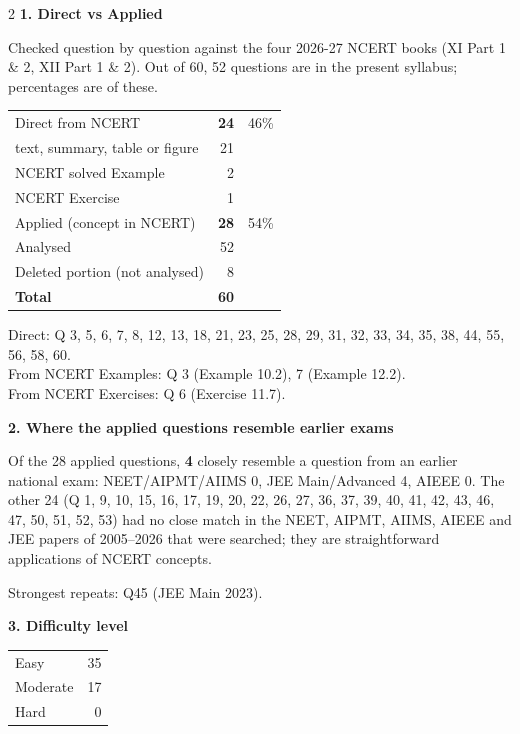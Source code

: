 \vspace{4pt}
\begin{multicols}{2}
\textbf{\color{crimson}1. Direct vs Applied}\par\smallskip
{\footnotesize Checked question by question against the four 2026-27 NCERT books (XI Part 1 \& 2, XII Part 1 \& 2). Out of 60, 52 questions are in the present syllabus; percentages are of these.}\par\smallskip
\begin{tabular}{@{}lrr@{}}\toprule
Direct from NCERT & \textbf{24} & 46\%\\
\quad text, summary, table or figure & 21 &\\
\quad NCERT solved Example & 2 &\\
\quad NCERT Exercise & 1 &\\
Applied (concept in NCERT) & \textbf{28} & 54\%\\\midrule
Analysed & 52 &\\
Deleted portion (not analysed) & 8 &\\\midrule
\textbf{Total} & \textbf{60} &\\\bottomrule\end{tabular}\par\smallskip
{\footnotesize Direct: Q 3, 5, 6, 7, 8, 12, 13, 18, 21, 23, 25, 28, 29, 31, 32, 33, 34, 35, 38, 44, 55, 56, 58, 60.\\ From NCERT Examples: Q 3 (Example 10.2), 7 (Example 12.2).\\ From NCERT Exercises: Q 6 (Exercise 11.7).}\par\medskip
\textbf{\color{crimson}2. Where the applied questions resemble earlier exams}\par\smallskip
Of the 28 applied questions, \textbf{4} closely resemble a question from an earlier national exam:
NEET/AIPMT/AIIMS 0, JEE Main/Advanced 4, AIEEE 0. The other 24 (Q 1, 9, 10, 15, 16, 17, 19, 20, 22, 26, 27, 36, 37, 39, 40, 41, 42, 43, 46, 47, 50, 51, 52, 53) had no close match in the NEET, AIPMT, AIIMS, AIEEE and JEE papers of 2005--2026 that were searched; they are straightforward applications of NCERT concepts.\par
{\footnotesize Strongest repeats: Q45 (JEE Main 2023).}\par\medskip
\textbf{\color{crimson}3. Difficulty level}\par\smallskip
\begin{tabular}{@{}lr@{}}\toprule
Easy & 35\\ Moderate & 17\\ Hard & 0\\\bottomrule\end{tabular}\par\smallskip

\end{multicols}
